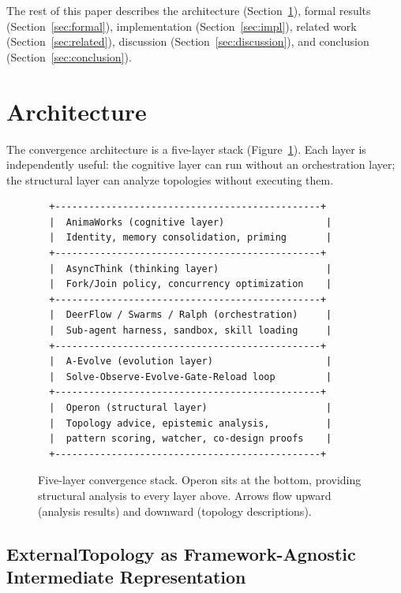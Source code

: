 \documentclass[11pt]{article}
\begin{document}
The rest of this paper describes the architecture (Section~\ref{sec:arch}),
formal results (Section~\ref{sec:formal}), implementation
(Section~\ref{sec:impl}), related work (Section~\ref{sec:related}),
discussion (Section~\ref{sec:discussion}), and conclusion
(Section~\ref{sec:conclusion}).

\section{Architecture}\label{sec:arch}

The convergence architecture is a five-layer stack (Figure~\ref{fig:stack}).
Each layer is independently useful: the cognitive layer can run without an
orchestration layer; the structural layer can analyze topologies without
executing them.

\begin{figure}[ht]
\centering
\begin{verbatim}
  +-----------------------------------------------+
  |  AnimaWorks (cognitive layer)                  |
  |  Identity, memory consolidation, priming       |
  +-----------------------------------------------+
  |  AsyncThink (thinking layer)                   |
  |  Fork/Join policy, concurrency optimization    |
  +-----------------------------------------------+
  |  DeerFlow / Swarms / Ralph (orchestration)     |
  |  Sub-agent harness, sandbox, skill loading     |
  +-----------------------------------------------+
  |  A-Evolve (evolution layer)                    |
  |  Solve-Observe-Evolve-Gate-Reload loop         |
  +-----------------------------------------------+
  |  Operon (structural layer)                     |
  |  Topology advice, epistemic analysis,          |
  |  pattern scoring, watcher, co-design proofs    |
  +-----------------------------------------------+
\end{verbatim}
\caption{Five-layer convergence stack.  Operon sits at the bottom,
providing structural analysis to every layer above.  Arrows flow upward
(analysis results) and downward (topology descriptions).}
\label{fig:stack}
\end{figure}

\subsection{ExternalTopology as Framework-Agnostic Intermediate Representation}
\end{document}
